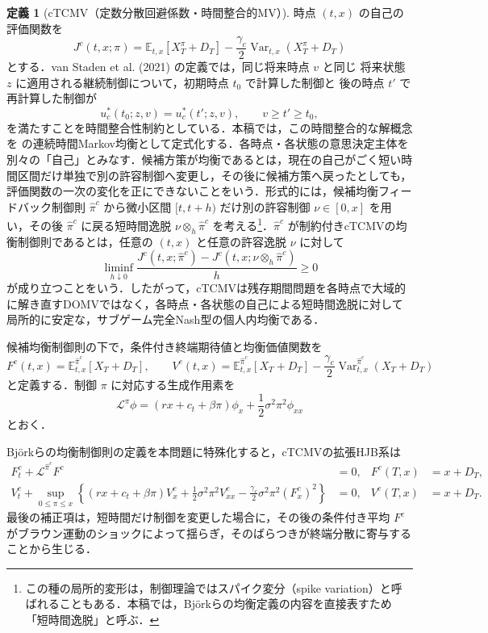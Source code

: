 \documentclass[10pt,a4paper]{article}
\theoremstyle{plain}
\theoremstyle{definition}
\newtheorem{definition}{定義}
\newcommand{\E}{\mathbb{E}}
\DeclareMathOperator{\Var}{Var}
\newcommand{\Lop}{\mathcal{L}}
\begin{document}
\begin{definition}[cTCMV（定数分散回避係数・時間整合的MV）]
\label{def:ctcmv}
時点 $(t,x)$ の自己の評価関数を
\[
  J^c(t,x;\pi)=\E_{t,x}[X_T^\pi+D_T]
  -\frac{\gamma_c}{2}\Var_{t,x}(X_T^\pi+D_T)
\]
とする．van Staden et al. (2021) の定義では，同じ将来時点 $v$ と同じ
将来状態 $z$ に適用される継続制御について，初期時点 $t_0$ で計算した制御と
後の時点 $t'$ で再計算した制御が
\[
  u_c^*(t_0;z,v)=u_c^*(t';z,v),
  \qquad v\geq t'\geq t_0,
\]
を満たすことを時間整合性制約としている．本稿では，この時間整合的な解概念を
\citet{BjorkKhapkoMurgoci2017} の連続時間Markov均衡として定式化する．各時点・各状態の意思決定主体を別々の「自己」とみなす．候補方策が均衡であるとは，現在の自己がごく短い時間区間だけ単独で別の許容制御へ変更し，その後に候補方策へ戻ったとしても，評価関数の一次の変化を正にできないことをいう．形式的には，候補均衡フィードバック制御則 $\hat\pi^c$ から微小区間 $[t,t+h)$ だけ別の許容制御 $\nu\in[0,x]$ を用い，その後 $\hat\pi^c$ に戻る短時間逸脱 $\nu\otimes_h\hat\pi^c$ を考える\footnote{この種の局所的変形は，制御理論ではスパイク変分（spike variation）と呼ばれることもある．本稿では，Björkらの均衡定義の内容を直接表すため「短時間逸脱」と呼ぶ．}．$\hat\pi^c$ が制約付きcTCMVの均衡制御則であるとは，任意の $(t,x)$ と任意の許容逸脱 $\nu$ に対して
\begin{equation}
  \liminf_{h\downarrow0}
  \frac{J^c(t,x;\hat\pi^c)-J^c(t,x;\nu\otimes_h\hat\pi^c)}{h}
  \geq0
  \label{eq:c-equilibrium}
\end{equation}
が成り立つことをいう．したがって，cTCMVは残存期間問題を各時点で大域的に解き直すDOMVではなく，各時点・各状態の自己による短時間逸脱に対して局所的に安定な，サブゲーム完全Nash型の個人内均衡である．
\end{definition}

候補均衡制御則の下で，条件付き終端期待値と均衡価値関数を
\begin{equation}
  F^c(t,x)=\E_{t,x}^{\hat\pi^c}[X_T+D_T],
  \qquad
  V^c(t,x)=\E_{t,x}^{\hat\pi^c}[X_T+D_T]
  -\frac{\gamma_c}{2}\Var_{t,x}^{\hat\pi^c}(X_T+D_T)
  \label{eq:ctcmv-FV}
\end{equation}
と定義する．制御 $\pi$ に対応する生成作用素を
\begin{equation}
  \Lop^\pi\phi
  =(rx+c_t+\beta\pi)\phi_x+\frac12\sigma^2\pi^2\phi_{xx}
  \label{eq:generator-x}
\end{equation}
とおく．

Björkらの均衡制御則の定義を本問題に特殊化すると，cTCMVの拡張HJB系は
\begin{align}
  F_t^c+\Lop^{\hat\pi^c}F^c&=0,
  &F^c(T,x)&=x+D_T,
  \label{eq:Fc}\\
  V_t^c+
  \sup_{0\leq\pi\leq x}
  \left\{
  (rx+c_t+\beta\pi)V_x^c
  +\frac12\sigma^2\pi^2V_{xx}^c
  -\frac{\gamma_c}{2}\sigma^2\pi^2(F_x^c)^2
  \right\}&=0,
  &V^c(T,x)&=x+D_T.
  \label{eq:Vc}
\end{align}
最後の補正項は，短時間だけ制御を変更した場合に，その後の条件付き平均 $F^c$ がブラウン運動のショックによって揺らぎ，そのばらつきが終端分散に寄与することから生じる．
\end{document}
